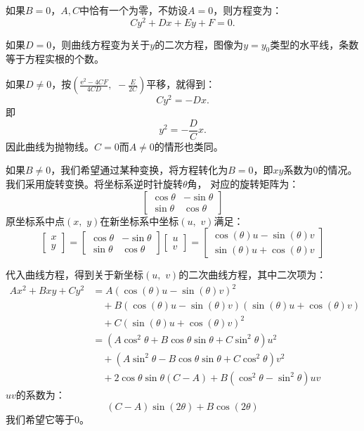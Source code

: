\documentclass[12pt,UTF8]{ctexbook}
\newcommand{\e}{\mathrm{e}}
\theoremstyle{definition}
\theoremstyle{plain}
\begin{document}
如果$B = 0$，$A,C$中恰有一个为零，不妨设$A = 0$，则方程变为：
$$ Cy^2 + Dx + Ey + F = 0.$$

如果$D = 0$，则曲线方程变为关于$y$的二次方程，图像为$y = y_0$类型的水平线，条数等于方程实根的个数。

如果$D\neq 0$，按$\displaystyle\left(\frac{\e^2 - 4CF}{4CD},\,\,-\frac{E}{2C}\right)$平移，就得到：
$$ Cy^2 = -Dx. $$
即
$$ y^2 = -\frac{D}{C}x. $$
因此曲线为抛物线。$C=0$而$A\neq 0$的情形也类同。

如果$B\neq 0$，我们希望通过某种变换，将方程转化为$B = 0$，即$xy$系数为$0$的情况。我们采用旋转变换。将坐标系逆时针旋转$\theta$角，
对应的旋转矩阵为：
$$
\begin{bmatrix}
    \cos{\theta} & -\sin{\theta} \\
    \sin{\theta} & \cos{\theta} 
\end{bmatrix}
$$
原坐标系中点$(x,\,\,y)$在新坐标系中坐标$(u,\,\,v)$满足：
$$
\begin{bmatrix}
    x \\ y
\end{bmatrix}
=
\begin{bmatrix}
    \cos{\theta} & -\sin{\theta} \\
    \sin{\theta} & \cos{\theta} 
\end{bmatrix}
\begin{bmatrix}
    u \\ v
\end{bmatrix}
= 
\begin{bmatrix}
    \cos{(\theta)}u - \sin{(\theta)}v \\ \sin{(\theta)}u + \cos{(\theta)}v
\end{bmatrix}
$$


代入曲线方程，得到关于新坐标$(u,\,\,v)$的二次曲线方程，其中二次项为：
\begin{align*}
    Ax^2 + Bxy + Cy^2 &= A(\cos{(\theta)}u - \sin{(\theta)}v)^2 \\
    &\quad + B(\cos{(\theta)}u - \sin{(\theta)}v)(\sin{(\theta)}u + \cos{(\theta)}v) \\
    &\quad + C(\sin{(\theta)}u + \cos{(\theta)}v)^2 \\
    &= (A\cos^2{\theta} + B\cos{\theta}\sin{\theta} + C\sin^2{\theta})u^2 \\
    &\quad + (A\sin^2{\theta} - B\cos{\theta}\sin{\theta} + C\cos^2{\theta})v^2 \\
    &\quad + 2\cos{\theta}\sin{\theta}(C - A) + B(\cos^2{\theta} - \sin^2{\theta})uv
\end{align*}
$uv$的系数为：
$$ (C - A)\sin{(2\theta)} + B\cos{(2\theta)} $$
我们希望它等于$0$。
\end{document}
